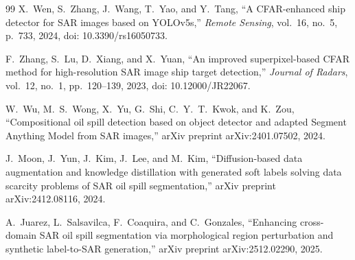 \documentclass[a4paper,11pt]{article}
\begin{document}
\begin{thebibliography}{99}
X.~Wen, S.~Zhang, J.~Wang, T.~Yao, and Y.~Tang,
``A CFAR-enhanced ship detector for SAR images based on YOLOv5s,''
\textit{Remote Sensing}, vol.~16, no.~5, p.~733, 2024, doi: 10.3390/rs16050733.

F.~Zhang, S.~Lu, D.~Xiang, and X.~Yuan,
``An improved superpixel-based CFAR method for high-resolution SAR image ship target detection,''
\textit{Journal of Radars}, vol.~12, no.~1, pp.~120--139, 2023, doi: 10.12000/JR22067.

W.~Wu, M.~S.~Wong, X.~Yu, G.~Shi, C.~Y.~T.~Kwok, and K.~Zou,
``Compositional oil spill detection based on object detector and adapted Segment Anything Model from SAR images,''
arXiv preprint arXiv:2401.07502, 2024.

J.~Moon, J.~Yun, J.~Kim, J.~Lee, and M.~Kim,
``Diffusion-based data augmentation and knowledge distillation with generated soft labels solving data scarcity problems of SAR oil spill segmentation,''
arXiv preprint arXiv:2412.08116, 2024.

A.~Juarez, L.~Salsavilca, F.~Coaquira, and C.~Gonzales,
``Enhancing cross-domain SAR oil spill segmentation via morphological region perturbation and synthetic label-to-SAR generation,''
arXiv preprint arXiv:2512.02290, 2025.

\end{thebibliography}
\end{document}
